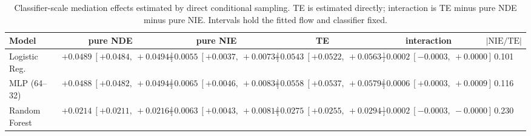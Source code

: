 \begin{table}[htbp]
  \centering
  \caption{Classifier-scale mediation effects estimated by direct conditional sampling. TE is estimated directly; interaction is TE minus pure NDE minus pure NIE. Intervals hold the fitted flow and classifier fixed.}
  \label{tab:german_synth_m0_gap_overall}
  \begin{tabular}{lccccc}
    \toprule
    Model & pure NDE & pure NIE & TE & interaction & $|\mathrm{NIE}/\mathrm{TE}|$ \\
    \midrule
    Logistic Reg. & $+0.0489\ [+0.0484,\ +0.0494]$ & $+0.0055\ [+0.0037,\ +0.0073]$ & $+0.0543\ [+0.0522,\ +0.0563]$ & $-0.0002\ [-0.0003,\ +0.0000]$ & 0.101 \\
    MLP (64--32) & $+0.0488\ [+0.0482,\ +0.0494]$ & $+0.0065\ [+0.0046,\ +0.0083]$ & $+0.0558\ [+0.0537,\ +0.0579]$ & $+0.0006\ [+0.0003,\ +0.0009]$ & 0.116 \\
    Random Forest & $+0.0214\ [+0.0211,\ +0.0216]$ & $+0.0063\ [+0.0043,\ +0.0081]$ & $+0.0275\ [+0.0255,\ +0.0294]$ & $-0.0002\ [-0.0003,\ -0.0000]$ & 0.230 \\
    \bottomrule
  \end{tabular}
\end{table}